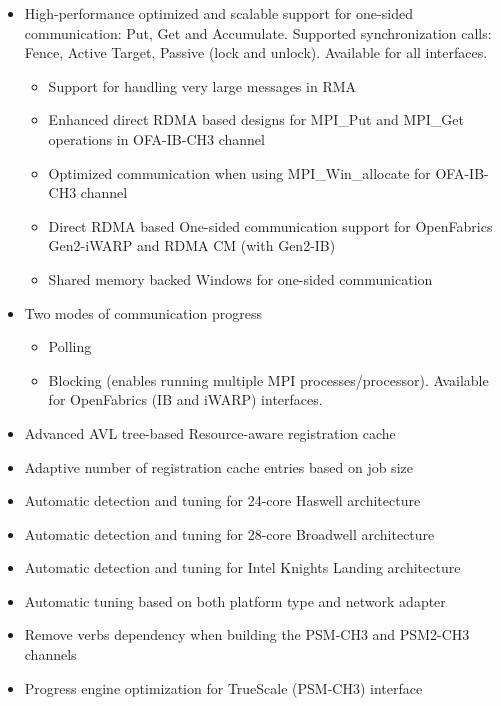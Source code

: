 \begin{itemize}
  \item  
    High-performance optimized and scalable support for one-sided
    communication: Put, Get and Accumulate. Supported synchronization
    calls: Fence, Active Target, Passive (lock and unlock). Available
	for all interfaces.
	\begin{itemize}
          \item  Support for handling very large messages in RMA
          \item  Enhanced direct RDMA based designs for MPI\_Put and MPI\_Get operations in OFA-IB-CH3 channel
          \item  Optimized communication when using MPI\_Win\_allocate for OFA-IB-CH3 channel
          \item  Direct RDMA based One-sided communication support for OpenFabrics
	       Gen2-iWARP and RDMA CM (with Gen2-IB)
          \item  Shared memory backed Windows 
               for one-sided communication 
  	 
	\end{itemize}
  

  \item 
    Two modes of communication progress
    \begin{itemize}
      \item  Polling 
      \item  Blocking (enables running multiple MPI
      processes/processor). Available for OpenFabrics (IB and iWARP)
      interfaces. 
    \end{itemize}
  


  \item  Advanced AVL tree-based Resource-aware registration cache 
  \item  Adaptive number of registration cache entries based on job size
  
  \item  Automatic detection and tuning for 24-core Haswell architecture
  \item  Automatic detection and tuning for 28-core Broadwell architecture
  \item  Automatic detection and tuning for Intel Knights Landing architecture

  \item  Automatic tuning based on both platform type and network adapter

  \item    Remove verbs dependency when building the PSM-CH3 and PSM2-CH3 channels
  \item  Progress engine optimization for TrueScale (PSM-CH3) interface


\end{itemize}
